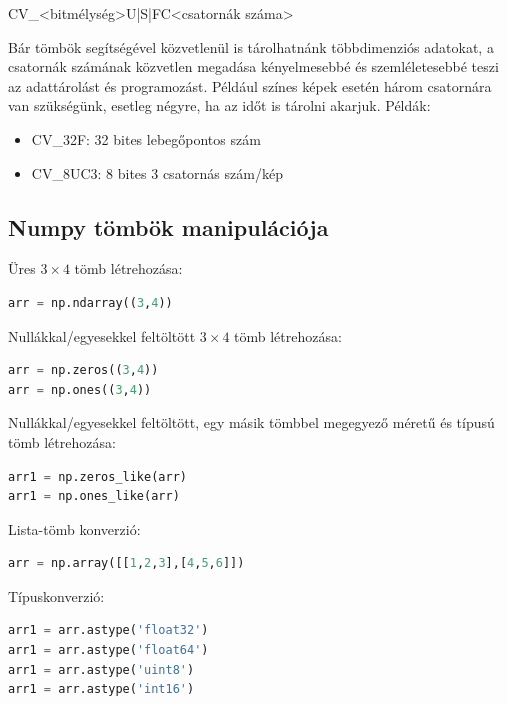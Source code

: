 \documentclass[12pt,a4paper,oneside]{report}             %
\begin{document}
\begin{center} 
	CV\_<bitmélység>{U|S|F}C<csatornák száma>
\end{center} 

Bár tömbök segítségével közvetlenül is tárolhatnánk többdimenziós adatokat, a csatornák számának közvetlen megadása kényelmesebbé és szemléletesebbé teszi az adattárolást és programozást. Például színes képek esetén három csatornára van szükségünk, esetleg négyre, ha az időt is tárolni akarjuk.
Példák:
\begin{itemize}
	\item CV\_32F: 32 bites lebegőpontos szám
	\item CV\_8UC3: 8 bites 3 csatornás szám/kép
\end{itemize}

\subsection{Numpy tömbök manipulációja}

Üres $3\times 4$ tömb létrehozása:

\begin{lstlisting}[language=Python]
arr = np.ndarray((3,4))
\end{lstlisting}

Nullákkal/egyesekkel feltöltött $3\times 4$ tömb létrehozása:

\begin{lstlisting}[language=Python]
arr = np.zeros((3,4))
arr = np.ones((3,4))
\end{lstlisting}

Nullákkal/egyesekkel feltöltött, egy másik tömbbel megegyező méretű és típusú tömb létrehozása:

\begin{lstlisting}[language=Python]
arr1 = np.zeros_like(arr)
arr1 = np.ones_like(arr)
\end{lstlisting}

Lista-tömb konverzió:

\begin{lstlisting}[language=Python]
arr = np.array([[1,2,3],[4,5,6]])
\end{lstlisting}

Típuskonverzió:

\begin{lstlisting}[language=Python]
arr1 = arr.astype('float32')
arr1 = arr.astype('float64')
arr1 = arr.astype('uint8')
arr1 = arr.astype('int16')
\end{lstlisting}
\end{document}
